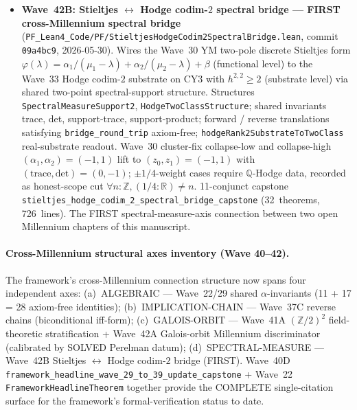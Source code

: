 \begin{itemize}
\item \textbf{Wave~42B: Stieltjes $\leftrightarrow$ Hodge codim-$2$
  spectral bridge --- FIRST cross-Millennium spectral bridge}
  (\texttt{PF\_Lean4\_Code/PF/StieltjesHodgeCodim2SpectralBridge.lean},
  commit \texttt{09a4bc9}, 2026-05-30). Wires the Wave~30 YM two-pole
  discrete Stieltjes form
  $\varphi(\lambda) = \alpha_1/(\mu_1 - \lambda) + \alpha_2/(\mu_2 - \lambda) + \beta$
  (functional level) to the Wave~33 Hodge codim-$2$ substrate
  on CY$3$ with $h^{2,2} \geq 2$ (substrate level) via shared
  two-point spectral-support structure. Structures
  \texttt{SpectralMeasureSupport2}, \texttt{HodgeTwoClassStructure};
  shared invariants trace, det, support-trace, support-product;
  forward / reverse translations satisfying \texttt{bridge\_round\_trip}
  axiom-free; \texttt{hodgeRank2SubstrateToTwoClass} real-substrate
  readout. Wave~30 cluster-fix collapse-low and collapse-high
  $(\alpha_1, \alpha_2) = (-1, 1)$ lift to $(z_0, z_1) = (-1, 1)$
  with $(\mathrm{trace}, \mathrm{det}) = (0, -1)$; $\pm 1/4$-weight
  cases require $\mathbb{Q}$-Hodge data, recorded as honest-scope
  cut $\forall n : \mathbb{Z}, (1/4 : \mathbb{R}) \neq n$. 11-conjunct
  capstone \texttt{stieltjes\_hodge\_codim\_2\_spectral\_bridge\_capstone}
  (32~theorems, 726~lines). The FIRST spectral-measure-axis
  connection between two open Millennium chapters of this manuscript.
\end{itemize}

\paragraph{Cross-Millennium structural axes inventory (Wave 40--42).}
The framework's cross-Millennium connection structure now spans four
independent axes:
(a)~ALGEBRAIC --- Wave~22/29 shared $\alpha$-invariants
(11 + 17 = 28 axiom-free identities);
(b)~IMPLICATION-CHAIN --- Wave~37C reverse chains
(biconditional iff-form);
(c)~GALOIS-ORBIT --- Wave~41A $(\mathbb{Z}/2)^2$ field-theoretic
stratification + Wave~42A Galois-orbit Millennium discriminator
(calibrated by SOLVED Perelman datum);
(d)~SPECTRAL-MEASURE --- Wave~42B Stieltjes $\leftrightarrow$
Hodge codim-$2$ bridge (FIRST). Wave~40D
\texttt{framework\_headline\_wave\_29\_to\_39\_update\_capstone}
+ Wave~22 \texttt{FrameworkHeadlineTheorem}
together provide the COMPLETE
single-citation surface for the framework's formal-verification
status to date.

